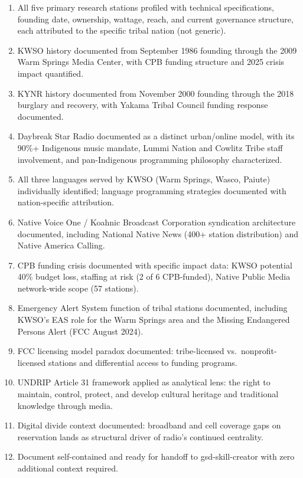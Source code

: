 \documentclass[11pt,letterpaper]{article}
\begin{document}
\begin{enumerate}
  \item All five primary research stations profiled with technical specifications, founding date, ownership, wattage, reach, and current governance structure, each attributed to the specific tribal nation (not generic).
  \item KWSO history documented from September 1986 founding through the 2009 Warm Springs Media Center, with CPB funding structure and 2025 crisis impact quantified.
  \item KYNR history documented from November 2000 founding through the 2018 burglary and recovery, with Yakama Tribal Council funding response documented.
  \item Daybreak Star Radio documented as a distinct urban/online model, with its 90\%+ Indigenous music mandate, Lummi Nation and Cowlitz Tribe staff involvement, and pan-Indigenous programming philosophy characterized.
  \item All three languages served by KWSO (Warm Springs, Wasco, Paiute) individually identified; language programming strategies documented with nation-specific attribution.
  \item Native Voice One / Koahnic Broadcast Corporation syndication architecture documented, including National Native News (400+ station distribution) and Native America Calling.
  \item CPB funding crisis documented with specific impact data: KWSO potential 40\% budget loss, staffing at risk (2 of 6 CPB-funded), Native Public Media network-wide scope (57 stations).
  \item Emergency Alert System function of tribal stations documented, including KWSO's EAS role for the Warm Springs area and the Missing Endangered Persons Alert (FCC August 2024).
  \item FCC licensing model paradox documented: tribe-licensed vs.\ nonprofit-licensed stations and differential access to funding programs.
  \item UNDRIP Article 31 framework applied as analytical lens: the right to maintain, control, protect, and develop cultural heritage and traditional knowledge through media.
  \item Digital divide context documented: broadband and cell coverage gaps on reservation lands as structural driver of radio's continued centrality.
  \item Document self-contained and ready for handoff to gsd-skill-creator with zero additional context required.
\end{enumerate}
\end{document}
